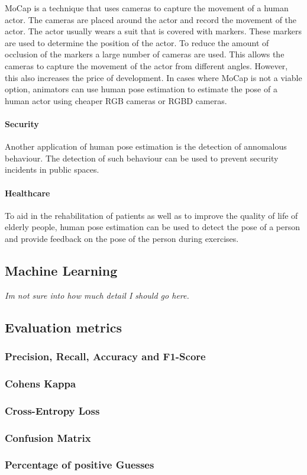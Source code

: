 MoCap is a technique that uses cameras to capture the movement of a human actor. The cameras are placed around the actor and record the movement of the actor. The actor usually wears a suit that is covered with markers. These markers are used to determine the position of the actor. To reduce the amount of occlusion of the markers a large number of cameras are used. This allows the cameras to capture the movement of the actor from different angles. However, this also increases the price of development. In cases where MoCap is not a viable option, animators can use human pose estimation to estimate the pose of a human actor using cheaper RGB cameras or RGBD cameras.

\paragraph{Security}

Another application of human pose estimation is the detection of annomalous behaviour. The detection of such behaviour can be used to prevent security incidents in public spaces.

\paragraph{Healthcare}

To aid in the rehabilitation of patients as well as to improve the quality of life of elderly people, human pose estimation can be used to detect the pose of a person and provide feedback on the pose of the person during exercises.\cite{ClinicalApplicationChen}

\subsection{Machine Learning}

\textit{Im not sure into how much detail I should go here.}

\subsection{Evaluation metrics}

\subsubsection{Precision, Recall, Accuracy and F1-Score}

\subsubsection{Cohens Kappa}

\subsubsection{Cross-Entropy Loss}

\subsubsection{Confusion Matrix}

\subsubsection{Percentage of positive Guesses}